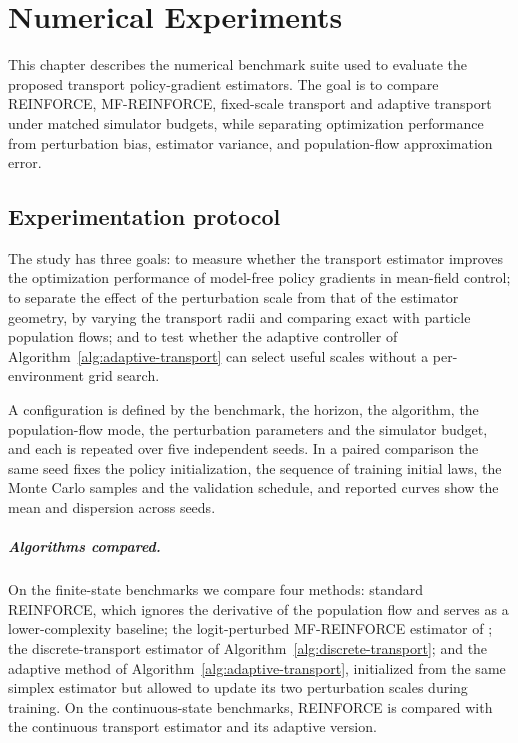\chapter{Numerical Experiments}
\label{chapter:experiments}

This chapter describes the numerical benchmark suite used to evaluate the proposed transport policy-gradient estimators. The goal is to compare REINFORCE, MF-REINFORCE, fixed-scale transport and adaptive transport under matched simulator budgets, while separating optimization performance from perturbation bias, estimator variance, and population-flow approximation error.

\section{Experimentation protocol}
\label{subsec:experimentation-protocol}

The study has three goals: to measure whether the transport estimator improves the optimization performance of model-free policy gradients in mean-field control; to separate the effect of the perturbation scale from that of the estimator geometry, by varying the transport radii and comparing exact with particle population flows; and to test whether the adaptive controller of Algorithm~\ref{alg:adaptive-transport} can select useful scales without a per-environment grid search.

A configuration is defined by the benchmark, the horizon, the algorithm, the population-flow mode, the perturbation parameters and the simulator budget, and each is repeated over five independent seeds. In a paired comparison the same seed fixes the policy initialization, the sequence of training initial laws, the Monte Carlo samples and the validation schedule, and reported curves show the mean and dispersion across seeds.

\paragraph{Algorithms compared.}
On the finite-state benchmarks we compare four methods: standard REINFORCE, which ignores the derivative of the population flow and serves as a lower-complexity baseline; the logit-perturbed MF-REINFORCE estimator of \cite{meunier2026model}; the discrete-transport estimator of Algorithm~\ref{alg:discrete-transport}; and the adaptive method of Algorithm~\ref{alg:adaptive-transport}, initialized from the same simplex estimator but allowed to update its two perturbation scales during training. On the continuous-state benchmarks, REINFORCE is compared with the continuous transport estimator and its adaptive version.

